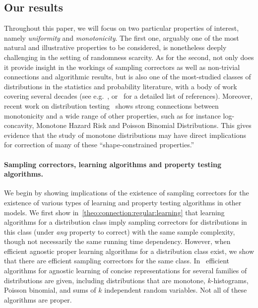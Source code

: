 \subsection{Our results}

Throughout this paper, we will focus on two particular properties of interest, 
namely \emph{uniformity} and \emph{monotonicity}. 
The first one, arguably one of the most natural and illustrative properties to be considered, 
is nonetheless deeply challenging in the setting of randomness scarcity. As for the second, 
not only does it provide insight in the workings of sampling correctors as well as non-trivial connections and algorithmic results, 
but is also one of the most-studied classes of distributions in the statistics and probability literature, with a body of work covering several decades (see 
e.g.~\cite{Grenander:56,Birge:87,BKR:04,DDS:12}, or~\cite{DDSVV:13} for a detailed list of references). 
Moreover, recent work on distribution testing~\cite{DDSVV:13,CDGR:15} shows strong 
connections between monotonicity and a wide range of other properties, 
such as for instance log-concavity, Monotone Hazard Risk and Poisson Binomial Distributions. 
This gives evidence that the study of monotone distributions may have direct implications for 
correction of many of these ``shape-constrained properties.''

\paragraph{Sampling correctors, learning algorithms and property testing algorithms.}
We begin by showing implications of the existence of
sampling correctors for the existence of various types of learning and property
testing algorithms in other 
models. We first show in~\autoref{theo:connection:regular:learning} that learning algorithms for a distribution class
imply sampling correctors for distributions in this class (under
 \emph{any} property to correct) with the same sample complexity,
though not necessarily the same running time dependency.  
However,  when efficient agnostic proper
learning algorithms for a distribution class
exist, {we show that} there are efficient sampling correctors 
for the same class.
In~\cite{Birge:87,CDSS:14} efficient algorithms for agnostic learning of
concise representations
for several families of distributions are given, including distributions
that are monotone, $k$-histograms, Poisson binomial, and sums of $k$ independent
random variables.  Not all of these algorithms are proper. 

